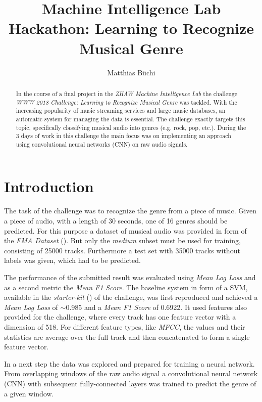 \documentclass[11pt, twocolumn]{article}
\title{Machine Intelligence Lab Hackathon: Learning to Recognize Musical Genre}
\author{Matthias Büchi}
\begin{document}
\maketitle

\begin{abstract}
In the course of a final project in the \textit{ZHAW Machine Intelligence Lab} the challenge \textit{WWW 2018 Challenge: Learning to Recognize Musical Genre} was tackled. With the increasing popularity of music streaming services and large music databases, an automatic system for managing the data is essential. The challenge exactly targets this topic, specifically classifying musical audio into genres (e.g. rock, pop, etc.). During the 3 days of work in this challenge the main focus was on implementing an approach using convolutional neural networks (CNN) on raw audio signals.
\end{abstract}

\section{Introduction}

The task of the challenge was to recognize the genre from a piece of music. Given a piece of audio, with a length of 30 seconds, one of 16 genres should be predicted. For this purpose a dataset of musical audio was provided in form of the \textit{FMA Dataset} (\cite{fma}). But only the \textit{medium} subset must be used for training, consisting of 25000 tracks. Furthermore a test set with 35000 tracks without labels was given, which had to be predicted.

The performance of the submitted result was evaluated using \textit{Mean Log Loss} and as a second metric the \textit{Mean F1 Score}. The baseline system in form of a SVM, available in the \textit{starter-kit} (\cite{starterkit}) of the challenge, was first reproduced and achieved a \textit{Mean Log Loss} of $\sim$0.985 and a \textit{Mean F1 Score} of 0.6922. It used features also provided for the challenge, where every track has one feature vector with a dimension of 518. For different feature types, like \textit{MFCC}, the values and their statistics are average over the full track and then concatenated to form a single feature vector.

In a next step the data was explored and prepared for training a neural network. From overlapping windows of the raw audio signal a convolutional neural network (CNN) with subsequent fully-connected layers was trained to predict the genre of a given window.
\end{document}
